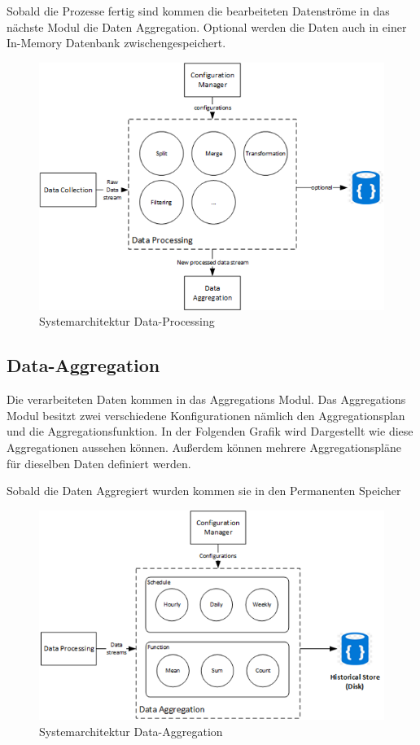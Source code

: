 Sobald die Prozesse fertig sind kommen die bearbeiteten Datenströme in das nächste Modul die Daten Aggregation. Optional werden die Daten auch in einer In-Memory Datenbank zwischengespeichert.
\begin{figure}[H]
    \centering
    \includegraphics[scale=1]{images/archDataProcessing.png}
    \caption{Systemarchitektur Data-Processing}
    \label{img:archDataProcessing}
\end{figure}
\subsection{Data-Aggregation}
Die verarbeiteten Daten kommen in das Aggregations Modul. Das Aggregations Modul besitzt zwei verschiedene Konfigurationen nämlich den Aggregationsplan und die Aggregationsfunktion. In der Folgenden Grafik wird Dargestellt wie diese Aggregationen aussehen können. Außerdem können mehrere Aggregationspläne für dieselben Daten definiert werden. 

Sobald die Daten Aggregiert wurden kommen sie in den Permanenten Speicher
\begin{figure}[H]
    \centering
    \includegraphics[scale=1]{images/archDataAggregation.png}
    \caption{Systemarchitektur Data-Aggregation}
    \label{img:archDataAggregation}
\end{figure}
